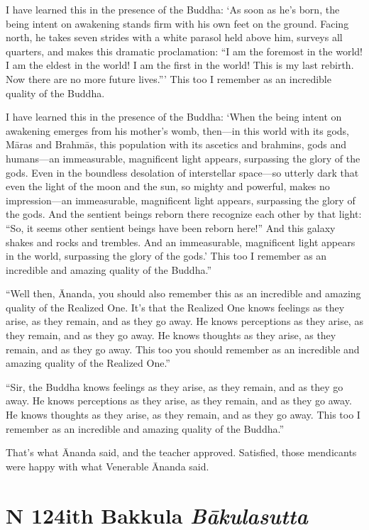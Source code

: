 \documentclass[12pt,openany]{book}%
\newcommand*{\suttatitleacronym}[1]{\smaller[2]{#1}\vspace*{.3em}}
\newcommand*{\suttatitletranslation}[1]{\linebreak{#1}}
\newcommand*{\suttatitleroot}[1]{\linebreak\smaller[2]\itshape{#1}}
\newcommand*{\tocacronym}[1]{\hspace*{-3.3em}{#1}\quad}
\newcommand*{\toctranslation}[1]{#1}
\newcommand*{\tocroot}[1]{(\textit{#1})}
\begin{document}
I have learned this in the presence of the Buddha: ‘As soon as he’s born, the being intent on awakening stands firm with his own feet on the ground. Facing north, he takes seven strides with a white parasol held above him, surveys all quarters, and makes this dramatic proclamation: “I am the foremost in the world! I am the eldest in the world! I am the first in the world! This is my last rebirth. Now there are no more future lives.”’ This too I remember as an incredible quality of the Buddha. 

I have learned this in the presence of the Buddha: ‘When the being intent on awakening emerges from his mother’s womb, then—in this world with its gods, \textsanskrit{Māras} and \textsanskrit{Brahmās}, this population with its ascetics and brahmins, gods and humans—an immeasurable, magnificent light appears, surpassing the glory of the gods. Even in the boundless desolation of interstellar space—so utterly dark that even the light of the moon and the sun, so mighty and powerful, makes no impression—an immeasurable, magnificent light appears, surpassing the glory of the gods. And the sentient beings reborn there recognize each other by that light: “So, it seems other sentient beings have been reborn here!” And this galaxy shakes and rocks and trembles. And an immeasurable, magnificent light appears in the world, surpassing the glory of the gods.’ This too I remember as an incredible and amazing quality of the Buddha.” 

“Well then, Ānanda, you should also remember this as an incredible and amazing quality of the Realized One. It’s that the Realized One knows feelings as they arise, as they remain, and as they go away. He knows perceptions as they arise, as they remain, and as they go away. He knows thoughts as they arise, as they remain, and as they go away. This too you should remember as an incredible and amazing quality of the Realized One.” 

“Sir, the Buddha knows feelings as they arise, as they remain, and as they go away. He knows perceptions as they arise, as they remain, and as they go away. He knows thoughts as they arise, as they remain, and as they go away. This too I remember as an incredible and amazing quality of the Buddha.” 

That’s what Ānanda said, and the teacher approved. Satisfied, those mendicants were happy with what Venerable Ānanda said. 

%
\section*{{\suttatitleacronym MN 124}{\suttatitletranslation With Bakkula }{\suttatitleroot Bākulasutta}}
\addcontentsline{toc}{section}{\tocacronym{MN 124} \toctranslation{With Bakkula } \tocroot{Bākulasutta}}
\end{document}
